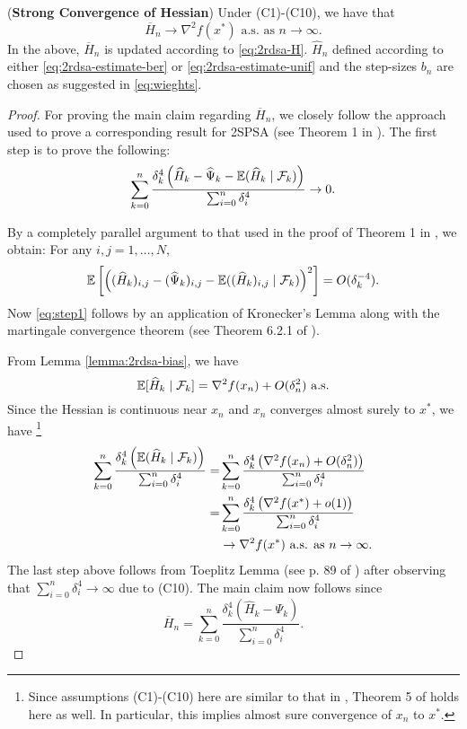 \begin{theorem}(\textbf{Strong Convergence of Hessian})
\label{thm:2rdsa-H}
Under (C1)-(C10), we have that 
$$\overline H_n \rightarrow \nabla^2 f(x^*) \text{ a.s. as } n\rightarrow \infty.$$ 
In the above, $\overline H_n$ is updated according to \eqref{eq:2rdsa-H}. $\widehat H_n$ defined according to either \eqref{eq:2rdsa-estimate-ber} or \eqref{eq:2rdsa-estimate-unif} and the step-sizes $b_n$ are chosen as suggested in \eqref{eq:wieghts}. 
\end{theorem}
\begin{proof}
For proving the main claim regarding $\overline H_n$, we closely follow the approach used to prove a corresponding result for 2SPSA (see Theorem 1 in \cite{spall-jacobian}). 
The first step is to prove the following:
\begin{align}
\sum_{k=0}^n \dfrac{\delta_k^4 \left(\widehat H_k - \widehat \Psi_k - \E(\widehat H_k \mid \F_k)\right)}{\sum_{i=0}^n \delta_i^4} \rightarrow 0.
\label{eq:step1}
\end{align}

By a completely parallel argument to that used in the proof of Theorem 1 in \cite{spall-jacobian}, we obtain: For any $i,j = 1,\ldots,N$,
\begin{align*}
\mathbb{E} \left[\left((\widehat {H}_k)_{i,j} - (\widehat {\Psi}_k)_{i,j} - \mathbb{E}((\widehat {H}_k)_{i,j} \mid \mathcal{F}_k)\right)^2\right] = O(\delta_k^{-4}).
\end{align*}
Now \eqref{eq:step1} follows by an application of Kronecker's Lemma along with the martingale convergence theorem (see Theorem 6.2.1 of \cite{lahaprobability}).

From Lemma \ref{lemma:2rdsa-bias}, we have 
$$ \mathbb{E}[ \widehat H_k \mid \mathcal{F}_k] = \nabla^2 f(x_n) + O(\delta_n^2) \text{ a.s.}$$
Since the Hessian is continuous near $x_n$ and $x_n$ converges almost surely to $x^*$, we have
\footnote{Since assumptions (C1)-(C10) here are similar to that in \cite{prashanth2015rdsa}, Theorem 5 of \cite{prashanth2015rdsa} holds here as well. In particular, this implies almost sure convergence of $x_n$ to $x^*$.}
\begin{align*}
\sum_{k=0}^n \dfrac{\delta_k^4 \left(\mathbb{E}(\widehat H_k \mid \mathcal{F}_k)\right)}{\sum_{i=0}^n \delta_i^4} 
=&\sum_{k=0}^n \dfrac{\delta_k^4 \left(\nabla^2 f(x_n) + O(\delta_n^2)\right)}{\sum_{i=0}^n \delta_i^4}\\
=&\sum_{k=0}^n \dfrac{\delta_k^4 \left(\nabla^2 f(x^*) + o(1)\right)}{\sum_{i=0}^n \delta_i^4}\\
&\rightarrow \nabla^2 f(x^*) \text{ a.s. as } n \rightarrow \infty.
\end{align*}
The last step above follows from Toeplitz Lemma (see p. 89 of \cite{lahaprobability}) after observing that $\sum_{i=0}^n \delta_i^4 \rightarrow \infty$ due to (C10). 
The main claim now follows since 
$$ \overline H_n = \sum_{k=0}^n \dfrac{\delta_k^4 \left(\widehat H_k - \Psi_k \right)}{\sum_{i=0}^n \delta_i^4}.$$
\end{proof}


